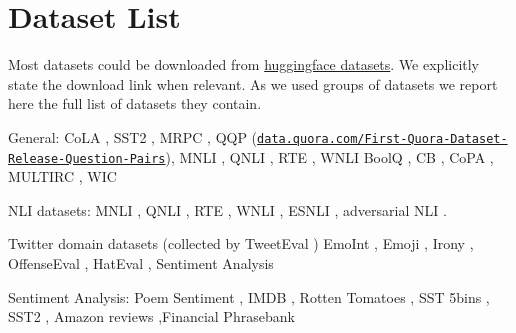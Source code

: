 \documentclass[nohyperref]{article}
\theoremstyle{plain}
\theoremstyle{definition}
\theoremstyle{remark}
\begin{document}
\FloatBarrier
\clearpage



\FloatBarrier
\clearpage
\appendix
\onecolumn
\section{Dataset List}\label{ap:sec:datasets}

Most datasets could be downloaded from \href{https://huggingface.co/datasets/}{huggingface datasets}. We explicitly state the download link when relevant.
As we used groups of datasets we report here the full list of datasets they contain.


General: CoLA \citep{warstadt-etal-2019-neural}, SST2 \citep{socher-etal-2013-recursive}, MRPC \citep{dolan-brockett-2005-automatically}, QQP (\href{https://data.quora.com/First-Quora-Dataset-Release-Question-Pairs}{\texttt{data.quora.com/\allowbreak First-\allowbreak Quora-\allowbreak Dataset-\allowbreak Release-Question-Pairs}}), MNLI \citep{williams-etal-2018-broad}, QNLI \citealt{rajpurkar-etal-2016-squad}, RTE \citep{Dagan2005ThePR,BarHaim2006TheSP,Giampiccolo2007TheTP,Bentivogli2009TheSP}, WNLI \citep{Levesque2011TheWS}
BoolQ \citep{clark-etal-2019-boolq}, CB \citep{demarneffe:cb}, CoPA \citep{roemmele2011choice}, MULTIRC \citep{khashabi2018looking}, WIC \citep{pilehvar2018wic}%

NLI datasets: MNLI \citep{williams-etal-2018-broad}, QNLI \citealt{rajpurkar-etal-2016-squad}, RTE \citep{Dagan2005ThePR,BarHaim2006TheSP,Giampiccolo2007TheTP,Bentivogli2009TheSP}, WNLI \citep{Levesque2011TheWS}, ESNLI \citep{Camburu2018eSNLINL}, adversarial NLI \citep{nie-etal-2020-adversarial}.

Twitter domain datasets (collected by TweetEval \citep{barbieri-etal-2020-tweeteval}) EmoInt \citep{MohammadB17starsem}, Emoji \citep{semeval2018task2}, Irony \citep{van-hee-etal-2018-semeval}, OffenseEval \citep{zampierietal2019}, HatEval \citep{basile-etal-2019-semeval}, Sentiment Analysis \citep{rosenthal-etal-2017-semeval}%

Sentiment Analysis: Poem Sentiment \citep{sheng-uthus-2020-investigating}, IMDB \citep{maas2011imdb}, Rotten Tomatoes \citep{pang-lee-2005-seeing}, SST 5bins \citep{socher-etal-2013-recursive}, SST2 \citep{socher-etal-2013-recursive}, Amazon reviews \citep{he2016ups} ,Financial Phrasebank \citep{malo2014good}
\end{document}
